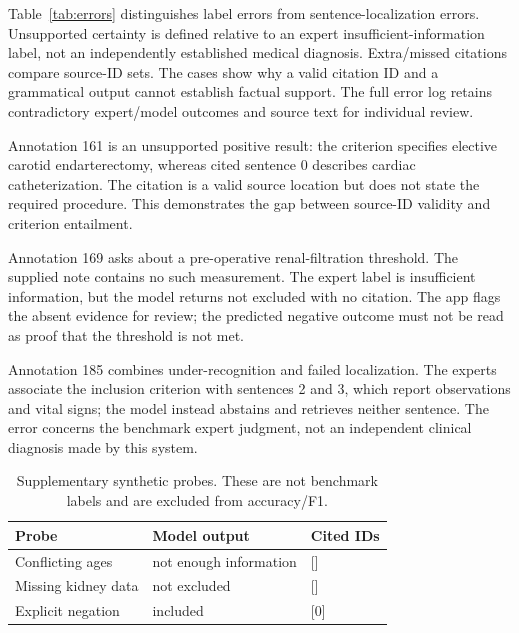 Table~\ref{tab:errors} distinguishes label errors from sentence-localization errors. Unsupported certainty is defined relative to an expert insufficient-information label, not an independently established medical diagnosis. Extra/missed citations compare source-ID sets. The cases show why a valid citation ID and a grammatical output cannot establish factual support. The full error log retains contradictory expert/model outcomes and source text for individual review.

Annotation 161 is an unsupported positive result: the criterion specifies elective carotid endarterectomy, whereas cited sentence 0 describes cardiac catheterization. The citation is a valid source location but does not state the required procedure. This demonstrates the gap between source-ID validity and criterion entailment.

Annotation 169 asks about a pre-operative renal-filtration threshold. The supplied note contains no such measurement. The expert label is insufficient information, but the model returns not excluded with no citation. The app flags the absent evidence for review; the predicted negative outcome must not be read as proof that the threshold is not met.

Annotation 185 combines under-recognition and failed localization. The experts associate the inclusion criterion with sentences 2 and 3, which report observations and vital signs; the model instead abstains and retrieves neither sentence. The error concerns the benchmark expert judgment, not an independent clinical diagnosis made by this system.

\begin{table}[t]\centering\scriptsize\caption{Supplementary synthetic probes. These are not benchmark labels and are excluded from accuracy/F1.}\label{tab:stress}\begin{tabular}{p{2.5cm}p{3.1cm}l}\toprule Probe & Model output & Cited IDs\\\midrule

Conflicting ages & not enough information & []\\

Missing kidney data & not excluded & []\\

Explicit negation & included & [0]\\

\bottomrule\end{tabular}\end{table}

